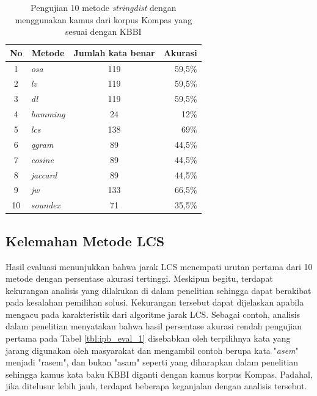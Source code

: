 \begin{table}[H]
	\captionsetup{justification=justified,singlelinecheck=false}
	\caption{Pengujian 10 metode \textit{stringdist} dengan menggunakan kamus dari korpus Kompas yang sesuai dengan KBBI}
    \label{tbl:ipb_eval_3}
    \centering
	\begin{tabularx}{\textwidth}{|c X c r|}
		\hline
		No & \multicolumn{1}{c}{Metode} & Jumlah kata benar & \multicolumn{1}{c|}{Akurasi} \\ \hline
		1 & \textit{osa} & 119 & 59,5\% \\
		2 & \textit{lv} & 119 & 59,5\% \\
		3 & \textit{dl} & 119 & 59,5\% \\
		4 & \textit{hamming} & 24 & 12\% \\
		5 & \textit{lcs} & 138 & 69\% \\
		6 & \textit{qgram} & 89 & 44,5\% \\
		7 & \textit{cosine} & 89 & 44,5\% \\
		8 & \textit{jaccard} & 89 & 44,5\% \\
		9 & \textit{jw} & 133 & 66,5\% \\
		10 & \textit{soundex} & 71 & 35,5\% \\ \hline
	\end{tabularx}
\end{table}

\subsection{Kelemahan Metode LCS}

Hasil evaluasi menunjukkan bahwa jarak LCS menempati urutan pertama dari 10 metode dengan persentase akurasi tertinggi. Meskipun begitu, terdapat kekurangan analisis yang dilakukan di dalam penelitian sehingga dapat berakibat pada kesalahan pemilihan solusi. Kekurangan tersebut dapat dijelaskan apabila mengacu pada karakteristik dari algoritme jarak LCS. Sebagai contoh, analisis dalam penelitian menyatakan bahwa hasil persentase akurasi rendah pengujian pertama pada Tabel \ref{tbl:ipb_eval_1} disebabkan oleh terpilihnya kata yang jarang digunakan oleh masyarakat dan mengambil contoh berupa kata "\textit{asem}" menjadi "rasem", dan bukan "asam" seperti yang diharapkan dalam penelitian sehingga kamus kata baku KBBI diganti dengan kamus korpus Kompas. Padahal, jika ditelusur lebih jauh, terdapat beberapa keganjalan dengan analisis tersebut.

